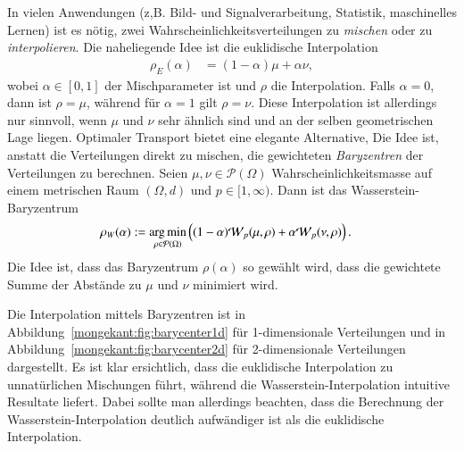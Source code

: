 In vielen Anwendungen
(z,B. Bild- und Signalverarbeitung, Statistik, maschinelles Lernen) ist es nötig,
zwei Wahrscheinlichkeitsverteilungen zu \emph{mischen}
oder zu \emph{interpolieren}.
Die naheliegende Idee ist die euklidische Interpolation
\begin{align}
\rho_E(\alpha)
&=
(1-\alpha) \mu + \alpha \nu
\label{mongekant:eq:euclidean_barycenter}
,
\end{align}
wobei $\alpha \in [0,1]$ der Mischparameter ist und $\rho$ die Interpolation.
Falls $\alpha=0$,
dann ist $\rho=\mu$,
während für $\alpha=1$ gilt $\rho=\nu$.
Diese Interpolation ist allerdings nur sinnvoll,
wenn $\mu$ und $\nu$ sehr ähnlich sind und an der selben geometrischen Lage liegen.
Optimaler Transport bietet eine elegante Alternative,
Die Idee ist,
anstatt die Verteilungen direkt zu mischen,
die gewichteten \emph{Baryzentren} der Verteilungen zu berechnen.
Seien $\mu, \nu \in \mathcal{P}(\Omega)$ Wahrscheinlichkeitsmasse
auf einem metrischen Raum $(\Omega, d)$
und $p \in [1, \infty)$.
Dann ist das Wasserstein-Baryzentrum
\begin{align}
\rho_W(\alpha)
&:=
\underset{\rho \in \mathcal{P}(\Omega)}{\mathrm{arg\,min}}\left(
(1-\alpha) \wasserstein(\mu, \rho)
+ \alpha \wasserstein(\nu, \rho)
\right)
\label{mongekant:eq:wasserstein_barycenter}
.
\end{align}
Die Idee ist,
dass das Baryzentrum $\rho(\alpha)$
so gewählt wird,
dass die gewichtete Summe der Abstände zu $\mu$ und $\nu$ minimiert wird.

Die Interpolation mittels Baryzentren
ist in Abbildung~\ref{mongekant:fig:barycenter1d} für 1-dimensionale Verteilungen
und in Abbildung~\ref{mongekant:fig:barycenter2d} für 2-dimensionale Verteilungen
dargestellt.
Es ist klar ersichtlich,
dass die euklidische Interpolation
zu unnatürlichen Mischungen führt,
während die Wasserstein-Interpolation
intuitive Resultate liefert.
Dabei sollte man allerdings beachten,
dass die Berechnung der Wasserstein-Interpolation
deutlich aufwändiger ist als die euklidische Interpolation.

